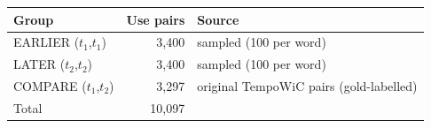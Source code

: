 \begin{tabular}{lrl}
\toprule
Group & Use pairs & Source \\
\midrule
EARLIER ($t_1$,$t_1$) & 3{,}400 & sampled (100 per word) \\
LATER ($t_2$,$t_2$) & 3{,}400 & sampled (100 per word) \\
COMPARE ($t_1$,$t_2$) & 3{,}297 & original TempoWiC pairs (gold-labelled) \\
\midrule
Total & 10{,}097 & \\
\bottomrule
\end{tabular}